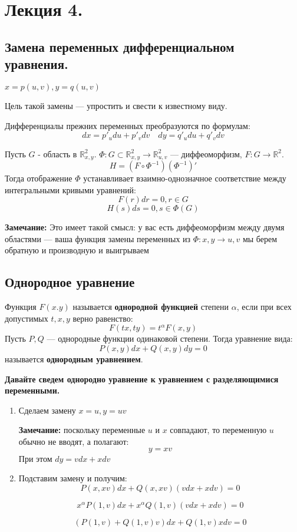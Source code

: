 \section{Лекция 4.}

\subsection{Замена переменных дифференциальном уравнения.}

$x = p(u,v), y = q(u,v)$

Цель такой замены --- упростить и свести к известному виду.

Дифференциалы прежних переменных преобразуются по формулам:
$$dx = p'_u du + p'_v dv \quad dy = q'_u du + q'_v dv$$


Пусть $G$ - область в $\mathbb{R}^2_{x,y}$. $\Phi: G \subset \mathbb{R}^2_{x,y}\xrightarrow{} \mathbb{R}_{u,v}^2$ --- диффеоморфизм, $F: G \rightarrow \mathbb{R}^2$. 
$$H = (F \circ \Phi^{-1})(\Phi^{-1})'$$
Тогда отображение $\Phi$ устанавливает взаимно-однозначное соответствие между интегральными кривыми уравнений:
$$F(r) d r = 0, r \in G$$
$$H(s) ds = 0, s \in \Phi(G)$$

\textbf{Замечание:} Это имеет такой смысл: у вас есть диффеоморфизм между двумя областями --- ваша функция замены переменных из $\Phi: x,y \rightarrow u,v $ мы берем обратную и производную и выигрываем

\subsection{Однородное уравнение}

 Функция $F(x.y)$ называется \textbf{однородной функцией} степени $\alpha$, если при всех допустимых $t,x,y$ верно равенство:
$$F(tx,ty) = t^{\alpha}F(x,y)$$
 Пусть $P,Q$ --- однородные функции одинаковой степени. Тогда уравнение вида:
$$P(x,y)dx + Q(x,y)dy = 0$$
называется \textbf{однородным уравнением}.

\textbf{Давайте сведем однородно уравнение к уравнением с разделяющимися переменными.}

\begin{enumerate}
    \item Сделаем замену $x =u, y = uv$

    \textbf{Замечание:} поскольку переменные $u$ и $x$  совпадают, то переменную $u$ обычно не вводят, а полагают:
    $$y =xv$$
    При этом $dy = vdx + x dv$
    \item Подставим замену и получим:
    $$P(x,xv) dx + Q(x,xv) (vdx + xdv)=0$$
    
    $$x^{\alpha}P(1,v)dx + x^{\alpha}Q(1,v) (vdx + xdv) =0$$
    
    $$(P(1,v) + Q(1,v)v)dx + Q(1,v)xdv =0$$
\end{enumerate}

